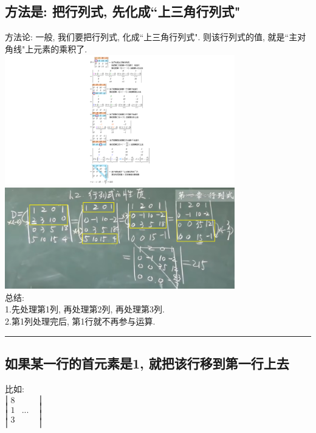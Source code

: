 \documentclass[UTF8]{ctexart}
\begin{document}
	\subsection{方法是: 把行列式, 先化成``上三角行列式"}
	
	方法论: 一般, 我们要把行列式, 化成``上三角行列式". 则该行列式的值, 就是``主对角线"上元素的乘积了. \\
	
	\includegraphics[width=0.75\textwidth]{img/0010.pdf}\\
	
	\includegraphics[width=0.75\textwidth]{img/0011.png}\\
	
	总结:\\
	1.先处理第1列, 再处理第2列, 再处理第3列. \\
	2.第1列处理完后, 第1行就不再参与运算. \\
	
	
	
	
	
	

	\hrule

	
	\subsection{如果某一行的首元素是1, 就把该行移到第一行上去} 
	
	比如: \\
	$
	\left| \begin{matrix}
		8&		&		\\
		1&		...&		\\
		3&		&		\\
	\end{matrix} \right|
	$\\
	
\end{document}
